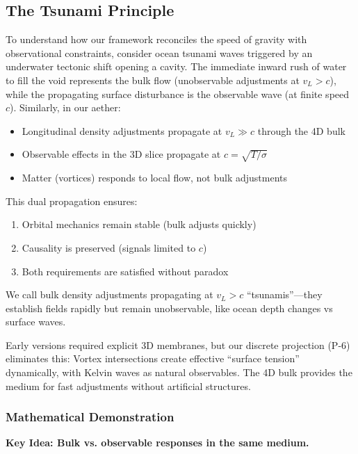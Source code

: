 \subsection{The Tsunami Principle}

To understand how our framework reconciles the speed of gravity with observational constraints, consider ocean tsunami waves triggered by an underwater tectonic shift opening a cavity. The immediate inward rush of water to fill the void represents the bulk flow (unobservable adjustments at $v_L > c$), while the propagating surface disturbance is the observable wave (at finite speed $c$). Similarly, in our aether:
\begin{itemize}
\item Longitudinal density adjustments propagate at $v_L \gg c$ through the 4D bulk
\item Observable effects in the 3D slice propagate at $c = \sqrt{T / \sigma}$
\item Matter (vortices) responds to local flow, not bulk adjustments
\end{itemize}

This dual propagation ensures:
\begin{enumerate}
\item Orbital mechanics remain stable (bulk adjusts quickly)
\item Causality is preserved (signals limited to $c$)
\item Both requirements are satisfied without paradox
\end{enumerate}

We call bulk density adjustments propagating at $v_L > c$ ``tsunamis''---they establish fields rapidly but remain unobservable, like ocean depth changes vs surface waves.

\begin{tcolorbox}[title=Why Two Speeds Without Membranes]
Early versions required explicit 3D membranes, but our discrete projection (P-6) eliminates this: Vortex intersections create effective ``surface tension'' dynamically, with Kelvin waves as natural observables. The 4D bulk provides the medium for fast adjustments without artificial structures.
\end{tcolorbox}

\subsubsection{Mathematical Demonstration}

\textbf{Key Idea: Bulk vs. observable responses in the same medium.}

